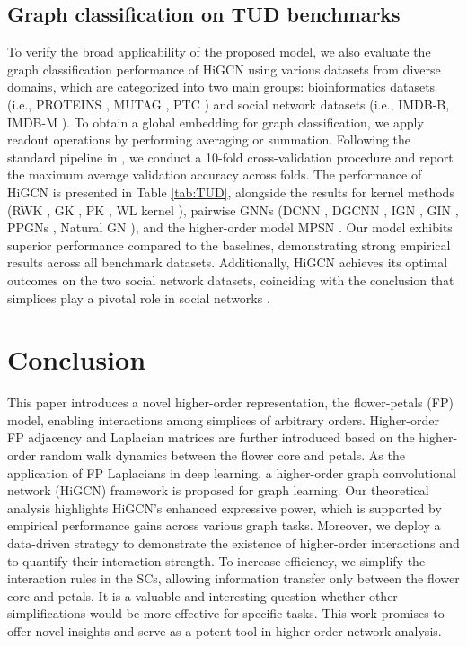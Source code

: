 \documentclass[letterpaper]{article} \usepackage{aaai24}
\theoremstyle{plain}
\theoremstyle{definition}
\theoremstyle{remark}
\begin{document}
\subsection{Graph classification on TUD benchmarks}
To verify the broad applicability of the proposed model, we also evaluate the graph classification performance of HiGCN using various datasets from diverse domains, which are categorized into two main groups: bioinformatics datasets (i.e., PROTEINS \cite{data:proteins2005}, MUTAG \cite{data:MUTAG}, PTC \cite{data:PTC}) and social network datasets (i.e., IMDB-B, IMDB-M \cite{data:IMDB-REDDIT}).
To obtain a global embedding for graph classification, we apply readout operations by performing averaging or summation. Following the standard pipeline in \cite{GIN2019}, we conduct a 10-fold cross-validation procedure and report the maximum average validation accuracy across folds.
The performance of HiGCN is presented in Table \ref{tab:TUD}, alongside the results for kernel methods (RWK \cite{RWK2003}, GK \cite{GK_2009efficient}, PK \cite{PK_2016neumann}, WL kernel \cite{WL_kernel_2011shervashidze}), pairwise GNNs (DCNN \cite{DCNN_atwood2016}, DGCNN \cite{DGCNN_zhang2018}, IGN \cite{IGN_2018}, GIN \cite{GIN2019}, PPGNs \cite{PPGNs_maron2019}, Natural GN \cite{natural_GN_2020}), and the higher-order model MPSN \cite{SWL2021}.
Our model exhibits superior performance compared to the baselines, demonstrating strong empirical results across all benchmark datasets. 
Additionally, HiGCN achieves its optimal outcomes on the two social network datasets, coinciding with the conclusion that simplices play a pivotal role in social networks \cite{battiston2021physics}.

\section{Conclusion}

This paper introduces a novel higher-order representation, the flower-petals (FP) model, enabling interactions among simplices of arbitrary orders.
Higher-order FP adjacency and Laplacian matrices are further introduced based on the higher-order random walk dynamics between the flower core and petals. 
As the application of FP Laplacians in deep learning, a higher-order graph convolutional network (HiGCN) framework is proposed for graph learning.  
Our theoretical analysis highlights HiGCN's enhanced expressive power, which is supported by empirical performance gains across various graph tasks.
Moreover, we deploy a data-driven strategy to demonstrate the existence of higher-order interactions and to quantify their interaction strength.
To increase efficiency, we simplify the interaction rules in the SCs, allowing information transfer only between the flower core and petals.
It is a valuable and interesting question whether other simplifications would be more effective for specific tasks.
This work promises to offer novel insights and serve as a potent tool in higher-order network analysis.
\end{document}
